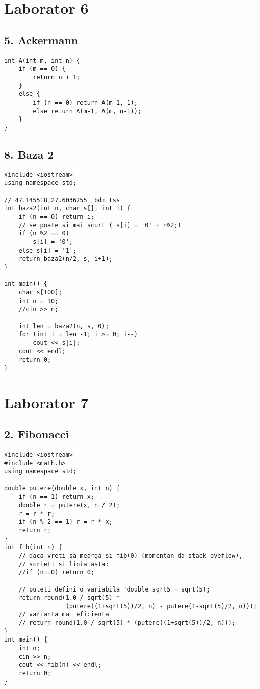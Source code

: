 \documentclass[11pt]{article}
\begin{document}
\section*{Laborator 6}
\label{sec:org2a992ed}
\subsection*{5. Ackermann}
\label{sec:org329f8fd}
\begin{verbatim}
int A(int m, int n) {
    if (m == 0) {
        return n + 1;
    }
    else {
        if (n == 0) return A(m-1, 1);
        else return A(m-1, A(m, n-1));
    }
}
\end{verbatim}

\subsection*{8. Baza 2}
\label{sec:orga7f62a3}

\begin{verbatim}
#include <iostream>
using namespace std;

// 47.145518,27.6036255  bdm tss
int baza2(int n, char s[], int i) {
    if (n == 0) return i;
    // se poate si mai scurt ( s[i] = '0' + n%2;)
    if (n %2 == 0)
        s[i] = '0';
    else s[i] = '1';
    return baza2(n/2, s, i+1);
} 

int main() {
    char s[100];
    int n = 10;
    //cin >> n;

    int len = baza2(n, s, 0);
    for (int i = len -1; i >= 0; i--)
        cout << s[i];
    cout << endl;
    return 0;
}

\end{verbatim}
\pagebreak

\section*{Laborator 7}
\label{sec:org0c320c6}
\subsection*{2. Fibonacci}
\label{sec:orgb1d8f72}
\begin{verbatim}
#include <iostream>
#include <math.h>
using namespace std;

double putere(double x, int n) {
    if (n == 1) return x;
    double r = putere(x, n / 2);
    r = r * r;
    if (n % 2 == 1) r = r * x;
    return r;
}
int fib(int n) {
    // daca vreti sa mearga si fib(0) (momentan da stack oveflow),
    // scrieti si linia asta:
    //if (n==0) return 0;

    // puteti defini o variabila 'double sqrt5 = sqrt(5);'
    return round(1.0 / sqrt(5) * 
                 (putere((1+sqrt(5))/2, n) - putere(1-sqrt(5)/2, n)));
    // varianta mai eficienta
    // return round(1.0 / sqrt(5) * (putere((1+sqrt(5))/2, n)));
}
int main() {
    int n;
    cin >> n;
    cout << fib(n) << endl;
    return 0;
}

\end{verbatim}
\end{document}
